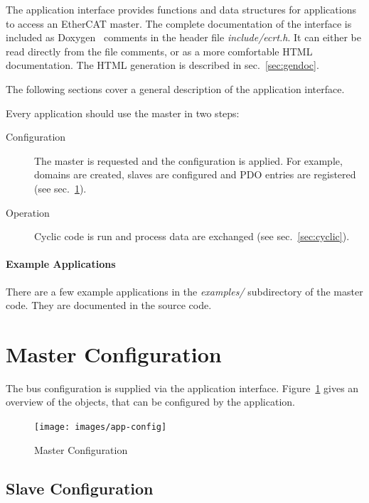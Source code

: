 \documentclass[a4paper,12pt,BCOR6mm,bibtotoc,idxtotoc]{scrbook}
\begin{document}
The application interface provides functions and data structures for
applications to access an EtherCAT master. The complete documentation of the
interface is included as Doxygen~\cite{doxygen} comments in the header file
\textit{include/ecrt.h}. It can either be read directly from the file
comments, or as a more comfortable HTML documentation. The HTML generation is
described in sec.~\ref{sec:gendoc}.

The following sections cover a general description of the application
interface.

Every application should use the master in two steps:

\begin{description}

\item[Configuration] The master is requested and the configuration is applied.
For example, domains are created, slaves are configured and PDO entries are
registered (see sec.~\ref{sec:masterconfig}).

\item[Operation] Cyclic code is run and process data are exchanged (see
sec.~\ref{sec:cyclic}).

\end{description}

\paragraph{Example Applications} There are a few
example applications in the \textit{examples/} subdirectory of the master
code. They are documented in the source code.


\section{Master Configuration}
\label{sec:masterconfig}

The bus configuration is supplied via the application interface.
Figure~\ref{fig:app-config} gives an overview of the objects, that can be
configured by the application.

\begin{figure}[htbp]
  \centering
  \texttt{[image: images/app-config]}
  \caption{Master Configuration}
  \label{fig:app-config}
\end{figure}

\subsection{Slave Configuration}
\end{document}
